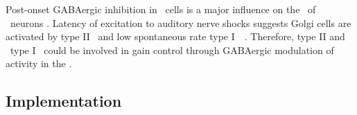 
Post-onset GABAergic inhibition in \DS~cells is a major influence on the \PSTH~of \OnC~neurons \citep{FerragamoGoldingEtAl:1998a,EvansZhao:1998}.
Latency of excitation to auditory nerve shocks suggests Golgi cells are activated by type II \ANFs~and low spontaneous rate type I~\ANFs~\citep{BensonBerglundEtAl:1996,FerragamoGoldingEtAl:1998}.
Therefore, type II and \LSR~type I \ANFs~could be involved in gain control through GABAergic modulation of activity in the \VCN.






\subsection{Implementation}





